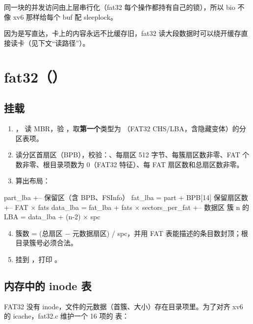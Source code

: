 同一块的并发访问由上层串行化（fat32 每个操作都持有自己的锁），所以 bio 不像 xv6 那样给每个 buf 配 sleeplock。

因为是写直达，卡上的内容永远不比缓存旧，fat32 读大段数据时可以绕开缓存直接读卡（见下文``读路径''）。

\section{fat32（）}

\subsection{挂载 }

\begin{enumerate}
  \item {}， 读 MBR，验 ，取\textbf{第一个}类型为 （FAT32 CHS/LBA，含隐藏变体）的分区表项。
  \item 读分区首扇区（BPB），校验：、每扇区 512 字节、每簇扇区数非零、FAT 个数非零、根目录项数为 0（FAT32 特征）、每 FAT 扇区数和总扇区数非零。
  \item 算出布局：
\end{enumerate}

\begin{txtcode}
part_lba
+-- 保留区（含 BPB、FSInfo）         fat_lba  = part + BPB[14] 保留扇区数
+-- FAT × fats                       data_lba = fat_lba + fats × sectors_per_fat
+-- 数据区                           簇 n 的 LBA = data_lba + (n-2) × spc
\end{txtcode}

\begin{enumerate}
  \setcounter{enumi}{3}
  \item 簇数 = (总扇区 $-$ 元数据扇区) / spc，并用 FAT 表能描述的条目数封顶；根目录簇号必须合法。
  \item 挂到 ，打印 。
\end{enumerate}

\subsection{内存中的 inode 表}

FAT32 没有 inode，文件的元数据（首簇、大小）存在目录项里。为了对齐 xv6 的 icache，fat32.c 维护一个 16 项的  表：

